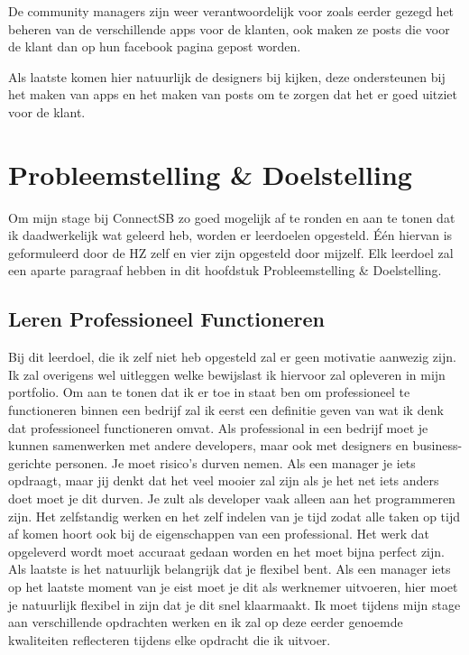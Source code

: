 \documentclass{article}
\begin{document}
De community managers zijn weer verantwoordelijk voor zoals eerder gezegd het beheren van de verschillende apps voor de klanten, ook maken ze posts die voor de klant dan op hun facebook pagina gepost worden.

Als laatste komen hier natuurlijk de designers bij kijken, deze ondersteunen bij het maken van apps en het maken van posts om te zorgen dat het er goed uitziet voor de klant.

\clearpage



\section{Probleemstelling & Doelstelling}
Om mijn stage bij ConnectSB zo goed mogelijk af te ronden en aan te tonen dat ik daadwerkelijk wat geleerd heb, worden er leerdoelen opgesteld. Één hiervan is geformuleerd door de HZ zelf en vier zijn opgesteld door mijzelf. Elk leerdoel zal een aparte paragraaf hebben in dit hoofdstuk Probleemstelling & Doelstelling.

\subsection{Leren Professioneel Functioneren}
Bij dit leerdoel, die ik zelf niet heb opgesteld zal er geen motivatie aanwezig zijn. Ik zal overigens wel uitleggen welke bewijslast ik hiervoor zal opleveren in mijn portfolio. 
Om aan te tonen dat ik er toe in staat ben om professioneel te functioneren binnen een bedrijf zal ik eerst een definitie geven van wat ik denk dat professioneel functioneren omvat. Als professional in een bedrijf moet je kunnen samenwerken met andere developers, maar ook met designers en business-gerichte personen. Je moet risico's durven nemen. Als een manager je iets opdraagt, maar jij denkt dat het veel mooier zal zijn als je het net iets anders doet moet je dit durven. Je zult als developer vaak alleen aan het programmeren zijn. Het zelfstandig werken en het zelf indelen van je tijd zodat alle taken op tijd af komen hoort ook bij de eigenschappen van een professional. Het werk dat opgeleverd wordt moet accuraat gedaan worden en het moet bijna perfect zijn. 
Als laatste is het natuurlijk belangrijk dat je flexibel bent. Als een manager iets op het laatste moment van je eist moet je dit als werknemer uitvoeren, hier moet je natuurlijk flexibel in zijn dat je dit snel klaarmaakt.
Ik moet tijdens mijn stage aan verschillende opdrachten werken en ik zal op deze eerder genoemde kwaliteiten reflecteren tijdens elke opdracht die ik uitvoer.

\end{document}
